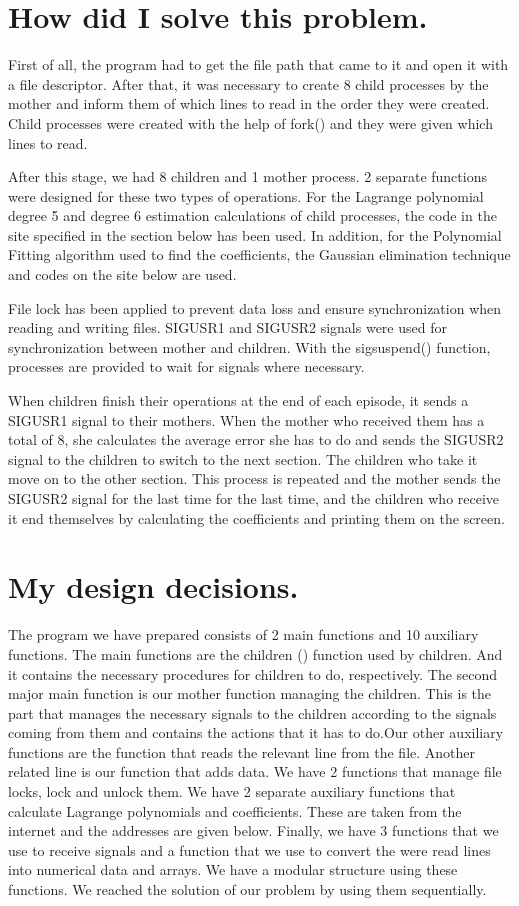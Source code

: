 \documentclass{article}
\begin{document}
\section{How did I solve this problem.}
\quad First of all, the program had to get the file path that came to it and open it with a file descriptor. After that, it was necessary to create 8 child processes by the mother and inform them of which lines to read in the order they were created. Child processes were created with the help of fork() and they were given which lines to read.
\par After this stage, we had 8 children and 1 mother process. 2 separate functions were designed for these two types of operations. For the Lagrange polynomial degree 5 and degree 6 estimation calculations of child processes, the code in the site specified in the section below has been used. In addition, for the Polynomial Fitting algorithm used to find the coefficients, the Gaussian elimination technique and codes on the site below are used. 
\par File lock has been applied to prevent data loss and ensure synchronization when reading and writing files. SIGUSR1 and SIGUSR2 signals were used for synchronization between mother and children. With the sigsuspend() function, processes are provided to wait for signals where necessary.
\par When children finish their operations at the end of each episode, it sends a SIGUSR1 signal to their mothers. When the mother who received them has a total of 8, she calculates the average error she has to do and sends the SIGUSR2 signal to the children to switch to the next section. The children who take it move on to the other section. This process is repeated and the mother sends the SIGUSR2 signal for the last time for the last time, and the children who receive it end themselves by calculating the coefficients and printing them on the screen.
\\


\section{My design decisions.}
 \quad The program we have prepared consists of 2 main functions and 10 auxiliary functions. The main functions are the children () function used by children. And it contains the necessary procedures for children to do, respectively. The second major main function is our mother function managing the children. This is the part that manages the necessary signals to the children according to the signals coming from them and contains the actions that it has to do.Our other auxiliary functions are the function that reads the relevant line from the file. Another related line is our function that adds data. We have 2 functions that manage file locks, lock and unlock them. We have 2 separate auxiliary functions that calculate Lagrange polynomials and coefficients. These are taken from the internet and the addresses are given below. Finally, we have 3 functions that we use to receive signals and a function that we use to convert the were read lines into numerical data and arrays. We have a modular structure using these functions. We reached the solution of our problem by using them sequentially.\\
\newpage
\end{document}
